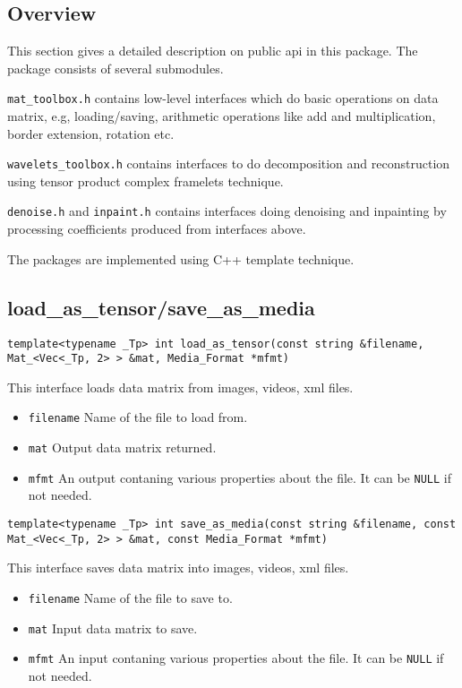 \documentclass[a4paper,5pt]{article}
\begin{document}
\subsection{Overview}
This section gives a detailed description on public api in this package. The package consists of several submodules.

\lstinline{mat_toolbox.h} contains low-level interfaces which do basic operations on data matrix, e.g, loading/saving, arithmetic operations like add and multiplication, border extension, rotation etc.

\lstinline{wavelets_toolbox.h} contains interfaces to do decomposition and reconstruction using tensor product complex framelets technique.

\lstinline{denoise.h} and \lstinline{inpaint.h} contains interfaces doing denoising and inpainting by processing coefficients produced from interfaces above.

The packages are implemented using C++ template technique.

\subsection{load\_as\_tensor/save\_as\_media}
\lstinline{template<typename _Tp> int load_as_tensor(const string &filename, Mat_<Vec<_Tp, 2> > &mat, Media_Format *mfmt)}


This interface loads data matrix from images, videos, xml files.

\begin{itemize}
\item \lstinline{filename} Name of the file to load from.
\item \lstinline{mat} Output data matrix returned.
\item \lstinline{mfmt} An output contaning various properties about the file. It can be \lstinline{NULL} if not needed.
\end{itemize}

\noindent
\lstinline{template<typename _Tp> int save_as_media(const string &filename, const Mat_<Vec<_Tp, 2> > &mat, const Media_Format *mfmt) }

This interface saves data matrix into images, videos, xml files.

\begin{itemize}
\item \lstinline{filename} Name of the file to save to.
\item \lstinline{mat} Input data matrix to save.
\item \lstinline{mfmt} An input contaning various properties about the file. It can be \lstinline{NULL} if not needed.
\end{itemize}
\end{document}
